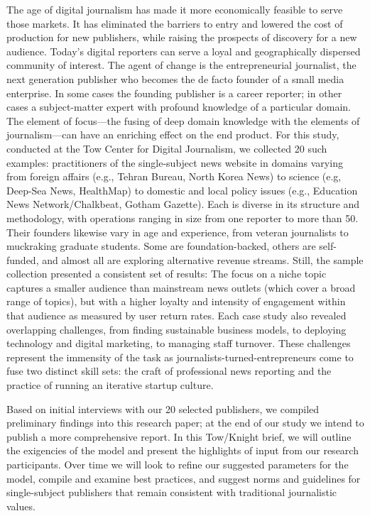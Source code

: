 The age of digital journalism has made it more economically feasible to
serve those markets. It has eliminated the barriers to entry and lowered
the cost of production for new publishers, while raising the prospects of
discovery for a new audience. Today’s digital reporters can serve a loyal and
geographically dispersed community of interest.
The agent of change is the entrepreneurial journalist, the next generation
publisher who becomes the de facto founder of a small media enterprise.
In some cases the founding publisher is a career reporter; in other cases a
subject-matter expert with profound knowledge of a particular domain. The
element of focus—the fusing of deep domain knowledge with the elements
of journalism—can have an enriching effect on the end product.
For this study, conducted at the Tow Center for Digital Journalism, we collected
20 such examples: practitioners of the single-subject news website
in domains varying from foreign affairs (e.g., Tehran Bureau, North Korea
News) to science (e.g, Deep-Sea News, HealthMap) to domestic and local
policy issues (e.g., Education News Network/Chalkbeat, Gotham Gazette).
Each is diverse in its structure and methodology, with operations ranging
in size from one reporter to more than 50. Their founders likewise vary in
age and experience, from veteran journalists to muckraking graduate students.
Some are foundation-backed, others are self-funded, and almost all
are exploring alternative revenue streams.
Still, the sample collection presented a consistent set of results: The focus
on a niche topic captures a smaller audience than mainstream news outlets
(which cover a broad range of topics), but with a higher loyalty and intensity
of engagement within that audience as measured by user return rates. Each
case study also revealed overlapping challenges, from finding sustainable
business models, to deploying technology and digital marketing, to managing
staff turnover. These challenges represent the immensity of the task as
journalists-turned-entrepreneurs come to fuse two distinct skill sets: the
craft of professional news reporting and the practice of running an iterative
startup culture.


Based on initial interviews with our 20 selected publishers, we compiled
preliminary findings into this research paper; at the end of our study we
intend to publish a more comprehensive report. In this Tow/Knight brief,
we will outline the exigencies of the model and present the highlights of
input from our research participants. Over time we will look to refine our
suggested parameters for the model, compile and examine best practices,
and suggest norms and guidelines for single-subject publishers that remain
consistent with traditional journalistic values.

